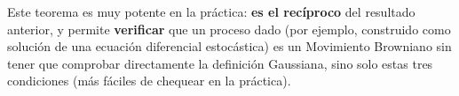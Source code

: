 \begin{observacion}
Este teorema es muy potente en la práctica: \textbf{es el recíproco} del resultado anterior, y permite \textbf{verificar} que un proceso dado (por ejemplo, construido como solución de una ecuación diferencial estocástica) es un Movimiento Browniano sin tener que comprobar directamente la definición Gaussiana, sino solo estas tres condiciones (más fáciles de chequear en la práctica).
\end{observacion}